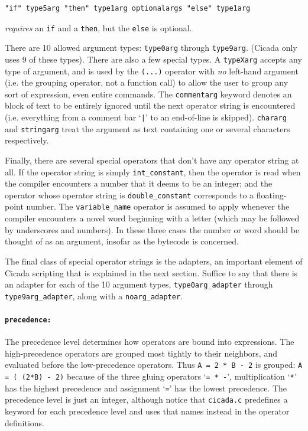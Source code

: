 \documentclass{article}
\newenvironment{code}{
       \begin{list}{}{
               \setlength{\leftmargin}{.4in}
               \setlength{\rightmargin}{0in}
               \setlength{\topsep}{.2in}
       }
       \small
       \item[] }
       { \end{list}   }
\begin{document}
\begin{code} \begin{verbatim}
"if" type5arg "then" type1arg optionalargs "else" type1arg
\end{verbatim} \end{code}

\noindent \emph{requires} an \verb#if# and a \verb#then#, but the \verb#else# is optional.

There are 10 allowed argument types:  \verb#type0arg# through \verb#type9arg#.  (Cicada only uses 9 of these types).  There are also a few special types.  A \verb#typeXarg# accepts any type of argument, and is used by the \verb#(...)# operator with \emph{no} left-hand argument (i.e. the grouping operator, not a function call) to allow the user to group any sort of expression, even entire commands.  The \verb#commentarg# keyword denotes an block of text to be entirely ignored until the next operator string is encountered (i.e. everything from a comment bar `\verb#|#' to an end-of-line is skipped).  \verb#chararg# and \verb#stringarg# treat the argument as text containing one or several characters respectively.

Finally, there are several special operators that don't have any operator string at all.  If the operator string is simply \verb#int_constant#, then the operator is read when the compiler encounters a number that it deems to be an integer; and the operator whose operator string is \verb#double_constant# corresponds to a floating-point number.  The \verb#variable_name# operator is assumed to apply whenever the compiler encounters a novel word beginning with a letter (which may be followed by underscores and numbers).  In these three cases the number or word should be thought of as an argument, insofar as the bytecode is concerned.

The final class of special operator strings is the adapters, an important element of Cicada scripting that is explained in the next section.  Suffice to say that there is an adapter for each of the 10 argument types, \verb#type0arg_adapter# through \verb#type9arg_adapter#, along with a \verb#noarg_adapter#.



\paragraph{\texttt{precedence:}}  The precedence level determines how operators are bound into expressions.  The high-precedence operators are grouped most tightly to their neighbors, and evaluated before the low-precedence operators.  Thus \verb#A = 2 * B - 2# is grouped:  \verb#A = ( (2*B) - 2)# because of the three gluing operators `\verb#= * -#', multiplication `\verb#*#' has the highest precedence and assignment `\verb#=#' has the lowest precedence.  The precedence level is just an integer, although notice that \verb#cicada.c# predefines a keyword for each precedence level and uses that names instead in the operator definitions.
\end{document}
